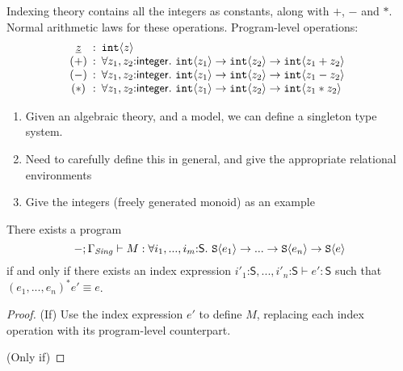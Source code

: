 Indexing theory contains all the integers as constants, along with
$+$, $-$ and $*$. Normal arithmetic laws for these
operations. Program-level operations:
\begin{displaymath}
  \begin{array}{@{}c@{\hspace{0.5em}:\hspace{0.5em}}l}
    \underline{z} & \tyPrim{int}{z} \\ %
    (+) & \forall z_1,z_2\mathord:\mathsf{integer}.\ \tyPrim{int}{z_1} \to \tyPrim{int}{z_2} \to \tyPrim{int}{z_1 + z_2} \\
    (-) & \forall z_1,z_2\mathord:\mathsf{integer}.\ \tyPrim{int}{z_1} \to \tyPrim{int}{z_2} \to \tyPrim{int}{z_1 - z_2} \\
    (*) & \forall z_1,z_2\mathord:\mathsf{integer}.\ \tyPrim{int}{z_1} \to \tyPrim{int}{z_2} \to \tyPrim{int}{z_1 * z_2}
  \end{array}
\end{displaymath}

\begin{enumerate}
\item Given an algebraic theory, and a model, we can define a
  singleton type system.
\item Need to carefully define this in general, and give the
  appropriate relational environments
\item Give the integers (freely generated monoid) as an example
\end{enumerate}

\begin{theorem}
  There exists a program
  \begin{displaymath}
    -; \Gamma_{\mathit{Sing}} \vdash M : \forall i_1,...,i_m\mathord:\mathsf{S}.\ \textup{\texttt{S}}\langle e_1 \rangle \to ... \to \textup{\texttt{S}}\langle e_n \rangle \to \textup{\texttt{S}}\langle e \rangle
  \end{displaymath}
  if and only if there exists an index expression
  $i'_1\mathord:\mathsf{S}, ..., i'_n\mathord:\mathsf{S} \vdash e' :
  \mathsf{S}$ such that $(e_1,...,e_n)^*e' \equiv e$.
\end{theorem}

\begin{proof}
  (If) Use the index expression $e'$ to define $M$, replacing each
  index operation with its program-level counterpart.

  (Only if) 
\end{proof}

